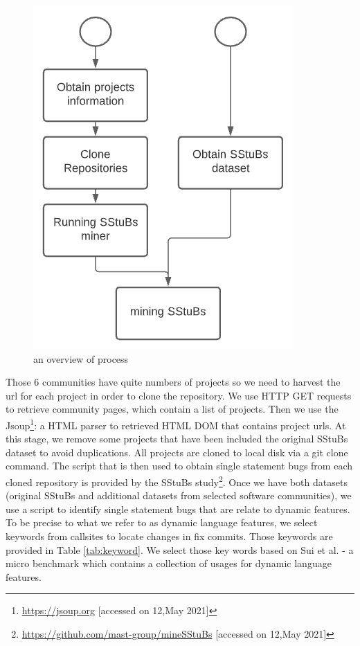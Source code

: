 \documentclass[sigconf,review,anonymous]{acmart}
\begin{document}
\begin{figure}[H]
  \centering
      \includegraphics[width=0.7\columnwidth]{figures/process.png}
  \caption{an overview of process}
  \label{fig:process}
\end{figure}


Those 6 communities have quite numbers of projects so we need to harvest the url for each project in order to clone the repository. We use HTTP GET requests to retrieve community pages, which contain a list of projects. Then we use the Jsoup\footnote{\url{https://jsoup.org} [accessed on 12,May 2021]}: a HTML parser to retrieved HTML DOM that contains project urls. At this stage, we remove some projects that have been included the original SStuBs dataset to avoid duplications. All projects are cloned to local disk via a git clone command.  
The script that is then used to obtain single statement bugs from each cloned repository is provided by the SStuBs study\footnote{\url{https://github.com/mast-group/mineSStuBs} [accessed on 12,May 2021]}.  Once we have both datasets (original SStuBs and additional datasets from selected software communities), we use a script to identify single statement bugs that are relate to dynamic features. To be precise to what we refer to as dynamic language features, we select keywords from callsites to locate changes in fix commits. Those keywords are provided in Table \ref{tab:keyword}. We select those key words based on Sui et al.\cite{sui2018soundness} - a micro benchmark which contains a collection of usages for dynamic language features.
\end{document}
